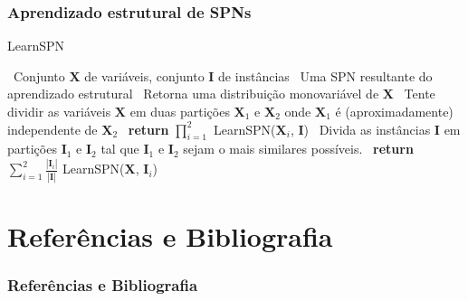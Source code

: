 \documentclass[10pt]{beamer}
\theoremstyle{plain}
\newcommand{\set}[1]{\mathbf{#1}}
\begin{document}
\begin{frame}
  \frametitle{Aprendizado estrutural de SPNs}
  \begin{algorithm}[H]
    \caption{LearnSPN~\cite{gens-domingos}}\label{learn-alg}
    \begin{algorithmic}[1]
      \Require~Conjunto $\set{X}$ de variáveis, conjunto $\set{I}$ de instâncias
      \Ensure~Uma SPN resultante do aprendizado estrutural
      \If{$|\set{X}|=1$}
        \State~Retorna uma distribuição monovariável de $\set{X}$
      \EndIf
      \State~Tente dividir as variáveis $\set{X}$ em duas partições $\set{X}_1$ e $\set{X}_2$ onde
        $\set{X}_1$ é (aproximadamente) independente de $\set{X}_2$
        \State~\textbf{return} $\prod_{i=1}^2$ LearnSPN($\set{X}_i$, $\set{I}$)
      \Else
        \State~Divida as instâncias $\set{I}$ em partições $\set{I}_1$ e $\set{I}_2$ tal que
          $\set{I}_1$ e $\set{I}_2$ sejam o mais similares possíveis.
        \State~\textbf{return} $\sum_{i=1}^2 \frac{|\set{I}_i|}{|\set{I}|}$ LearnSPN($\set{X}$,
          $\set{I}_i$)
      \EndIf
    \end{algorithmic}
  \end{algorithm}
\end{frame}


\section[Referências]{Referências e Bibliografia}
\begin{frame}[t,allowframebreaks]
  \frametitle{Referências e Bibliografia}
  \footnotesize
  \printbibliography[]
\end{frame}
\end{document}
